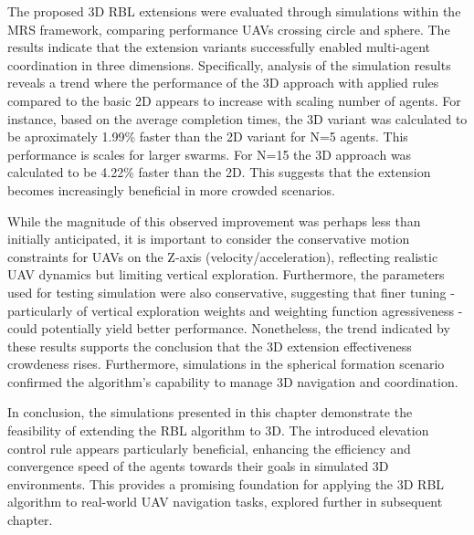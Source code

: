         The proposed \ac{3D} RBL extensions were evaluated through simulations within the MRS framework, comparing performance \ac{UAV}s crossing circle and sphere. 
        The results indicate that the extension variants successfully enabled multi-agent coordination in three dimensions.
        Specifically, analysis of the simulation results reveals a trend where the performance of the \ac{3D} approach with applied rules compared to the basic \ac{2D} appears to increase with scaling number of agents. 
        For instance, based on the average completion times, the \ac{3D} variant was calculated to be aproximately 1.99\% faster than the \ac{2D} variant for N=5 agents.
        This performance is scales for larger swarms.
        For N=15 the \ac{3D} approach was calculated to be 4.22\% faster than the \ac{2D}.
        This suggests that the extension becomes increasingly beneficial in more crowded scenarios.

        While the magnitude of this observed improvement was perhaps less than initially anticipated, it is important to consider the conservative motion constraints for \ac{UAV}s on the Z-axis (velocity/acceleration), reflecting realistic \ac{UAV} dynamics but limiting vertical exploration.
        Furthermore, the parameters used for testing simulation were also conservative, suggesting that finer tuning - particularly of vertical exploration weights and weighting function agressiveness - could potentially yield better performance.
        Nonetheless, the trend indicated by these results supports the conclusion that the \ac{3D} extension effectiveness crowdeness rises.
        Furthermore, simulations in the spherical formation scenario confirmed the algorithm's capability to manage \ac{3D} navigation and coordination.

        In conclusion, the simulations presented in this chapter demonstrate the feasibility of extending the RBL algorithm to \ac{3D}. 
        The introduced elevation control rule appears particularly beneficial, enhancing the efficiency and convergence speed of the agents towards their goals in simulated \ac{3D} environments. 
        This provides a promising foundation for applying the \ac{3D} RBL algorithm to real-world UAV navigation tasks, explored further in subsequent chapter.


